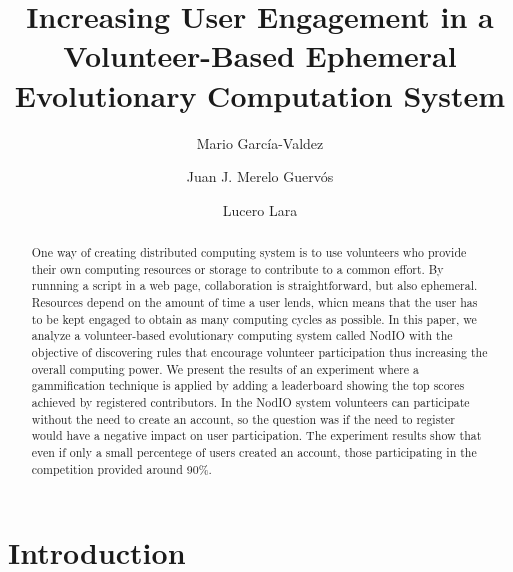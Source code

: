 \documentclass{llncs}
\begin{document}
\sloppy

\title{Increasing User Engagement in a Volunteer-Based Ephemeral Evolutionary Computation System}


\author{Mario Garc\'ia-Valdez \and Juan J. Merelo Guerv\'os \and  Lucero Lara }



\maketitle


\begin{abstract}

One way of creating distributed computing system is to use volunteers who
provide their own computing resources or storage to contribute to a common effort.
By runnning a script in a web page, collaboration is straightforward, but also ephemeral.
Resources depend on the amount of time a user lends, whicn means that 
the user has to be kept engaged to obtain as many computing cycles as
possible. In this paper, we analyze a volunteer-based evolutionary computing system called
NodIO with the objective of discovering rules that encourage volunteer
participation thus increasing the overall computing power. We present the results of
an experiment where a gammification technique is applied by adding a leaderboard 
showing the top scores achieved by registered contributors. In the NodIO system volunteers can
participate without the need to create an account, so the question was
if the need to register would have a negative impact on user participation. 
The experiment results show that even if only a small percentege of users created an account,
those participating in the competition provided around 90\%.

\end{abstract}

\section{Introduction}
\end{document}
